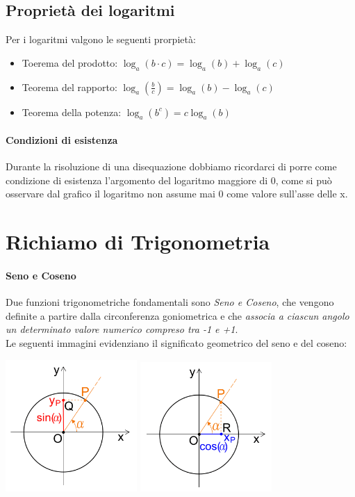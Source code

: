 \documentclass[12pt, a4paper, openany]{book}
\begin{document}
\subsection*{Proprietà dei logaritmi}
Per i logaritmi valgono le seguenti prorpietà:
\begin{itemize}
	\item Toerema del prodotto: $\log_a(b\cdot c) = \log_a(b) + \log_a(c)$
 \item Teorema del rapporto: $\log_a(\frac{b}{c})= \log_a(b) - \log_a(c)$
 \item Teorema della potenza: $\log_a(b^c) = c \log_a(b)$
\end{itemize}

\paragraph*{Condizioni di esistenza} Durante la risoluzione di una disequazione dobbiamo ricordarci
di porre come condizione di esistenza l'argomento del logaritmo maggiore di 0, come si può osservare dal grafico
il logaritmo non assume mai 0 come valore sull'asse delle x.
\section{Richiamo di Trigonometria}

\paragraph*{Seno e Coseno}
Due funzioni trigonometriche fondamentali sono \emph{Seno e Coseno}, che vengono definite
a partire dalla circonferenza goniometrica e che \emph{associa a ciascun angolo un determinato
valore numerico compreso tra -1 e +1}.
\\Le seguenti immagini evidenziano il significato geometrico del seno e del coseno:
\begin{center}
	\includegraphics[width=50mm, scale=0.5]{seno_geom.png}
	\includegraphics[width=50mm, scale=0.5]{coseno_geom.png}
\end{center}
\end{document}
